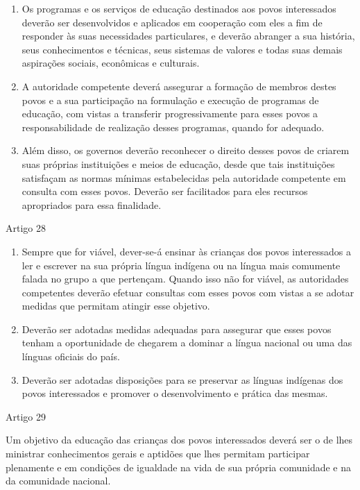 \documentclass[
]{book}
\begin{document}
\begin{enumerate}
\def\labelenumi{\arabic{enumi}.}
\item
  Os programas e os serviços de educação destinados aos povos interessados deverão ser desenvolvidos e aplicados em cooperação com eles a fim de responder às suas necessidades particulares, e deverão abranger a sua história, seus conhecimentos e técnicas, seus sistemas de valores e todas suas demais aspirações sociais, econômicas e culturais.
\item
  A autoridade competente deverá assegurar a formação de membros destes povos e a sua participação na formulação e execução de programas de educação, com vistas a transferir progressivamente para esses povos a responsabilidade de realização desses programas, quando for adequado.
\item
  Além disso, os governos deverão reconhecer o direito desses povos de criarem suas próprias instituições e meios de educação, desde que tais instituições satisfaçam as normas mínimas estabelecidas pela autoridade competente em consulta com esses povos. Deverão ser facilitados para eles recursos apropriados para essa finalidade.
\end{enumerate}

Artigo 28

\begin{enumerate}
\def\labelenumi{\arabic{enumi}.}
\item
  Sempre que for viável, dever-se-á ensinar às crianças dos povos interessados a ler e escrever na sua própria língua indígena ou na língua mais comumente falada no grupo a que pertençam. Quando isso não for viável, as autoridades competentes deverão efetuar consultas com esses povos com vistas a se adotar medidas que permitam atingir esse objetivo.
\item
  Deverão ser adotadas medidas adequadas para assegurar que esses povos tenham a oportunidade de chegarem a dominar a língua nacional ou uma das línguas oficiais do país.
\item
  Deverão ser adotadas disposições para se preservar as línguas indígenas dos povos interessados e promover o desenvolvimento e prática das mesmas.
\end{enumerate}

Artigo 29

Um objetivo da educação das crianças dos povos interessados deverá ser o de lhes ministrar conhecimentos gerais e aptidões que lhes permitam participar plenamente e em condições de igualdade na vida de sua própria comunidade e na da comunidade nacional.
\end{document}
